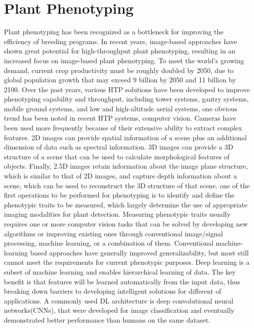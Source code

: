 

\section{Plant Phenotyping}

Plant phenotyping has been recognized as a bottleneck for improving the efficiency of breeding programs. In recent years, image-based approaches
have shown great potential for high-throughput plant phenotyping, resulting in an increased focus on image-based plant phenotyping.
To meet the world's growing demand, current crop productivity must be roughly doubled by 2050, due to global population growth that may exceed
9 billion by 2050 and 11 billion by 2100. Over the past years, various HTP solutions have been developed to improve phenotyping capability
and throughput, including tower systems, gantry systems, mobile ground systems, and low and high-altitude aerial systems, one obvious trend
has been noted in recent HTP systems, computer vision. Cameras have been used more frequently because of their extensive ability to extract
complex features. 2D images can provide spatial information of a scene plus an additional dimension of data such as spectral information.
3D images can provide a 3D structure of a scene that can be used to calculate morphological features of objects. Finally, 2.5D images retain
information about the image plane structure, which is similar to that of 2D images, and capture depth information about a scene, which can
be used to reconstruct the 3D structure of that scene. one of the first operations to be performed for phenotyping is to identify and
define the phenotypic traits to be measured, which largely determine the use of appropriate imaging modalities for plant detection.
Measuring phenotypic traits usually requires one or more computer vision tasks that can be solved by developing new algorithms or
improving existing ones through conventional image/signal processing, machine learning, or a combination of them. Conventional machine-learning
based approaches have generally improved generalizability, but most still cannot meet the requirements for current phenotypic purposes.
Deep learning is a subset of machine learning and enables hierarchical learning of data. The key benefit is that features will be learned
automatically from the input data, thus breaking down barriers to developing intelligent solutions for different of applications.
A commonly used DL architecture is deep convolutional neural networks(CNNs), that were developed for image classification and eventually
demonstrated better performance than humans on the same dataset.

